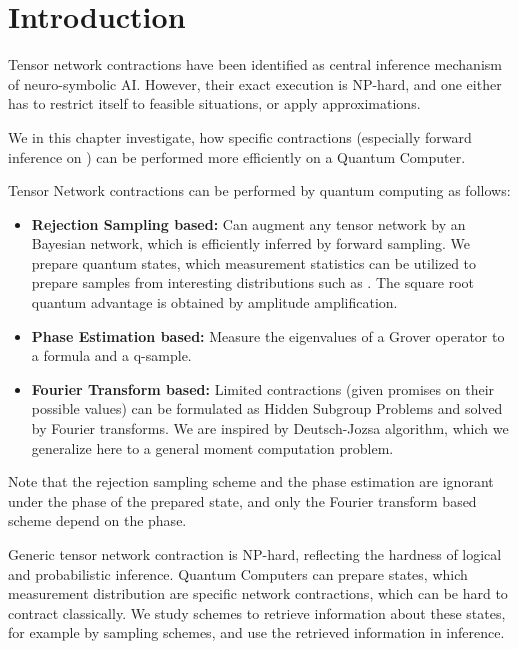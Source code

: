 
\section{Introduction}

Tensor network contractions have been identified as central inference mechanism of neuro-symbolic AI.
However, their exact execution is $\mathrm{NP}$-hard, and one either has to restrict itself to feasible situations, or apply approximations.

We in this chapter investigate, how specific contractions (especially forward inference on \ComputationActivationNetworks{}) can be performed more efficiently on a Quantum Computer.

Tensor Network contractions can be performed by quantum computing as follows:
\begin{itemize}
    \item \textbf{Rejection Sampling based:}
    Can augment any tensor network by an Bayesian network, which is efficiently inferred by forward sampling.
    We prepare quantum states, which measurement statistics can be utilized to prepare samples from interesting distributions such as \ComputationActivationNetworks{}.
    The square root quantum advantage is obtained by amplitude amplification.
    \item \textbf{Phase Estimation based:}
    Measure the eigenvalues of a Grover operator to a formula and a q-sample.
    \item \textbf{Fourier Transform based:}
    Limited contractions (given promises on their possible values) can be formulated as Hidden Subgroup Problems and solved by Fourier transforms.
    We are inspired by Deutsch-Jozsa algorithm, which we generalize here to a general moment computation problem.
\end{itemize}

%
Note that the rejection sampling scheme and the phase estimation are ignorant under the phase of the prepared state, and only the Fourier transform based scheme depend on the phase.

Generic tensor network contraction is $\mathrm{NP}$-hard, reflecting the hardness of logical and probabilistic inference.
Quantum Computers can prepare states, which measurement distribution are specific network contractions, which can be hard to contract classically.
We study schemes to retrieve information about these states, for example by sampling schemes, and use the retrieved information in inference.

